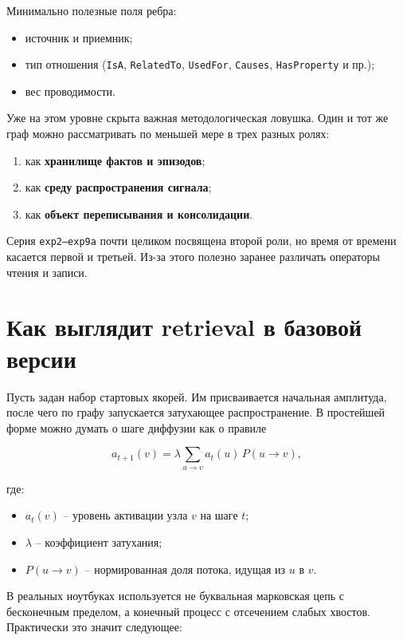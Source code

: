 Минимально полезные поля ребра:

\begin{itemize}[leftmargin=2em]
\item источник и приемник;
\item тип отношения (\texttt{IsA}, \texttt{RelatedTo}, \texttt{UsedFor},
\texttt{Causes}, \texttt{HasProperty} и пр.);
\item вес проводимости.
\end{itemize}

Уже на этом уровне скрыта важная методологическая ловушка. Один и тот же граф
можно рассматривать по меньшей мере в трех разных ролях:

\begin{enumerate}[leftmargin=2em]
\item как \textbf{хранилище фактов и эпизодов};
\item как \textbf{среду распространения сигнала};
\item как \textbf{объект переписывания и консолидации}.
\end{enumerate}

Серия \texttt{exp2--exp9a} почти целиком посвящена второй роли, но время от
времени касается первой и третьей. Из-за этого полезно заранее различать
операторы чтения и записи.

\section{Как выглядит retrieval в базовой версии}

Пусть задан набор стартовых якорей. Им присваивается начальная амплитуда, после
чего по графу запускается затухающее распространение. В простейшей форме можно
думать о шаге диффузии как о правиле

\[
a_{t+1}(v)=\lambda \sum_{u \to v} a_t(u)\, P(u \to v),
\]

где:

\begin{itemize}[leftmargin=2em]
\item $a_t(v)$ -- уровень активации узла $v$ на шаге $t$;
\item $\lambda$ -- коэффициент затухания;
\item $P(u \to v)$ -- нормированная доля потока, идущая из $u$ в $v$.
\end{itemize}

В реальных ноутбуках используется не буквальная марковская цепь с бесконечным
пределом, а конечный процесс с отсечением слабых хвостов. Практически это
значит следующее:

